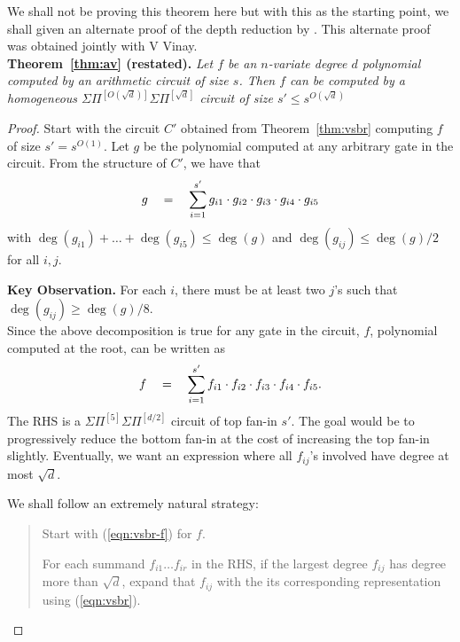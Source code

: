 \documentclass[12pt]{report}
\newcommand{\SPSPfanin}[2]{\Sigma\Pi^{[#1]}\Sigma\Pi^{[#2]}}
\begin{document}
\bigskip 

We shall not be proving this theorem here but with this as the starting point, we shall given an alternate proof of the depth reduction by \cite{av08,koiran,Tav13}. This alternate proof was obtained jointly with V Vinay. \\

{\bf Theorem~\ref{thm:av} (restated). }{\em 
  Let $f$ be an $n$-variate degree $d$ polynomial computed by an arithmetic circuit of size $s$. Then $f$ can be computed by a homogeneous $\SPSPfanin{O(\sqrt{d})}{\sqrt{d}}$ circuit of size $s' \leq s^{O(\sqrt{d})}$
}

\begin{proof}
Start with the circuit $C'$ obtained from Theorem~\ref{thm:vsbr} computing $f$ of size $s' = s^{O(1)}$. Let $g$ be the polynomial computed at any arbitrary gate in the circuit. From the structure of $C'$, we have that
\begin{equation}\label{eqn:vsbr}
g \quad = \quad \sum_{i=1}^{s'} g_{i1}\cdot g_{i2}\cdot g_{i3}\cdot g_{i4}\cdot g_{i5}
\end{equation}
with $\deg(g_{i1}) + \dots + \deg(g_{i5}) \leq \deg(g)$ and $\deg(g_{ij})\leq \deg(g)/2$ for all $i,j$. 

{\bf Key Observation. } For each $i$, there must be at least two $j$'s such that $\deg(g_{ij}) \geq \deg(g)/8$. \\

Since the above decomposition is true for any gate in the circuit, $f$,  polynomial computed at the root, can be written as
\begin{equation}\label{eqn:vsbr-f}
f \quad = \quad \sum_{i=1}^{s'} f_{i1}\cdot f_{i2}\cdot f_{i3}\cdot f_{i4}\cdot f_{i5}. 
\end{equation}
The RHS is a $\SPSPfanin{5}{d/2}$  circuit of top fan-in $s'$. The goal would be to progressively reduce the bottom fan-in at the cost of increasing the top fan-in slightly. Eventually, we want an expression where all $f_{ij}$'s involved have degree at most $\sqrt{d}$. 

We shall follow an extremely natural strategy: 
\begin{mdframed}
\begin{quote}
Start with (\ref{eqn:vsbr-f}) for $f$. 

For each summand $f_{i1}\dots f_{ir}$ in the RHS, if the largest degree $f_{ij}$ has degree more than $\sqrt{d}$, expand that $f_{ij}$ with the its corresponding representation using (\ref{eqn:vsbr}). 


\end{quote}
\end{mdframed}
\end{proof}
\end{document}
